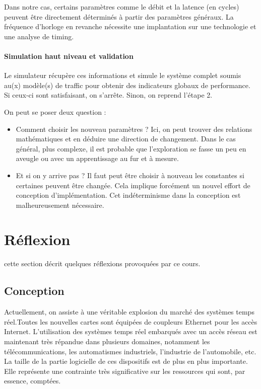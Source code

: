\documentclass[11pt]{article}
\begin{document}
Dans notre cas, certains paramètres comme le débit et la latence (en cycles) peuvent être directement déterminés à partir des paramètres généraux. La fréquence d'horloge en revanche nécessite une implantation sur une technologie et une analyse de timing.

\paragraph{Simulation haut niveau et validation}
Le simulateur récupère ces informations et simule le système complet soumis au(x) modèle(s) de traffic pour obtenir des indicateurs globaux de performance. Si ceux-ci sont satisfaisant, on s'arrête. Sinon, on reprend l'étape 2.

On peut se poser deux question :
\begin{itemize}
\item Comment choisir les nouveau paramètres ? Ici, on peut trouver des relations mathématiques et en déduire une direction de changement. Dans le cas général, plus complexe, il est probable que l'exploration se fasse un peu en aveugle ou avec un apprentissage au fur et à mesure.
\item Et si on y arrive pas ? Il faut peut être choisir à nouveau les constantes si certaines peuvent être changée. Cela implique forcément un nouvel effort de conception d'implémentation. Cet indéterminisme dans la conception est malheureusement nécessaire.
\end{itemize}

\section{Réflexion}

cette section décrit quelques réflexions provoquées par ce cours.

\subsection{Conception}

Actuellement, on assiste à une véritable explosion du marché des systèmes temps
réel.Toutes les nouvelles cartes sont équipées de coupleurs Ethernet pour les
accès Internet. L'utilisation des systèmes temps réel embarqués avec un accès
réseau est maintenant très répandue dans plusieurs domaines, notamment les 
télécommunications, les automatismes industriels, l'industrie de l’automobile,
etc. La taille de la partie logicielle de ces dispositifs est de plus en plus
importante. Elle représente une contrainte très significative sur les ressources
qui sont, par essence, comptées.
\end{document}
